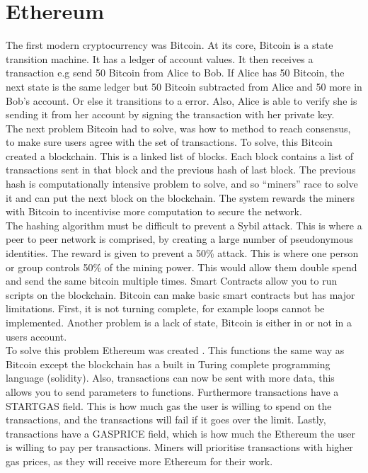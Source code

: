 \section{Ethereum}
The first modern cryptocurrency was Bitcoin. At its core, Bitcoin is a state transition machine. It has a ledger of account values. It then receives a transaction e.g send 50 Bitcoin from Alice to Bob. If Alice has 50 Bitcoin, the next state is the same ledger but 50 Bitcoin subtracted from Alice and 50 more in Bob's account. Or else it transitions to a error. Also, Alice is able to verify she is sending it from her account by signing the transaction with her private key. \\
The next problem Bitcoin had to solve, was how to method to reach consensus, to make sure users agree with the set of transactions. To solve, this Bitcoin created a blockchain. This is a linked list of blocks. Each block contains a list of transactions sent in that block and the previous hash of last block. The previous hash is computationally intensive problem to solve, and so “miners” race to solve it and can put the next block on the blockchain. The system rewards the miners with Bitcoin to incentivise more computation to secure the network. \\
The hashing algorithm must be difficult to prevent a Sybil attack. This is where a peer to peer network is comprised, by creating a large number of pseudonymous identities. The reward is given to prevent a 50\% attack. This is where one person or group controls 50\% of the mining power. This would allow them double spend and send the same bitcoin multiple times.
Smart Contracts allow you to run scripts on the blockchain. Bitcoin can make basic smart contracts but has major limitations. First, it is not turning complete, for example loops cannot be implemented. Another problem is a lack of state, Bitcoin is either in or not in a users account. \\
To solve this problem Ethereum was created \citep{EthereumWhitePaper:2018:pdflatex}. This functions the same way as Bitcoin except the blockchain has a built in Turing complete programming language (solidity). Also, transactions can now be sent with more data, this allows you to send parameters to functions. Furthermore transactions have a STARTGAS field. This is how much gas the user is willing to spend on the transactions, and the transactions will fail if it goes over the limit. Lastly, transactions have a GASPRICE field, which is how much the Ethereum the user is willing to pay per transactions. Miners will prioritise transactions with higher gas prices, as they will receive more Ethereum for their work.  
